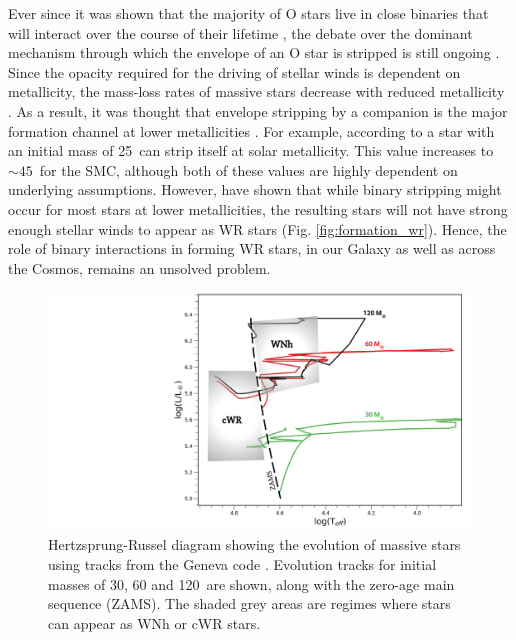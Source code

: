 Ever since it was shown that the majority of O stars live in close binaries that will interact over the course of their lifetime \citep{sana_binary_2012}, the debate over the dominant mechanism through which the envelope of an O star is stripped is still ongoing \citep{vanbeveren_wr_1998,foellmi_wolf-rayet_2003,shenar_wolf-rayet_2019,neugent_close_2014,shenar_why_2020}. Since the opacity required for the driving of stellar winds is dependent on metallicity, the mass-loss rates of massive stars decrease with reduced metallicity \citep{vink_mass-loss_2001,vink_metallicity_2005,hainich_wolf-rayet_2015,shenar_wolf-rayet_2019}. As a result, it was thought that envelope stripping by a companion is the major formation channel at lower metallicities \citep{maeder_new_1994,smith_mass_2014,groh_grids_2019}. For example, according to \citet{meynet_stellar_2003,meynet_stellar_2005} a star with an initial mass of 25\,\Msun{} can strip itself at solar metallicity. This value increases to ${\sim}45\,$\Msun{} for the SMC, although both of these values are highly dependent on underlying assumptions. However, \citet{shenar_why_2020} have shown that while binary stripping might occur for most stars at lower metallicities, the resulting stars will not have strong enough stellar winds to appear as WR stars (Fig. \ref{fig:formation_wr}). Hence, the role of binary interactions in forming WR stars, in our Galaxy as well as across the Cosmos, remains an unsolved problem.

\begin{figure}
    \centering
    \includegraphics[width=\hsize]{chapters/introduction/image/HRD_GENEVA.pdf}
    \caption{Hertzsprung-Russel diagram showing the evolution of massive stars using tracks from the Geneva code \citep{2012Ekstrom}. Evolution tracks for initial masses of 30, 60 and 120\,\Msun{} are shown, along with the zero-age main sequence (ZAMS). The shaded grey areas are regimes where stars can appear as WNh or cWR stars.}
    \label{fig:hrd_geneva}
\end{figure}


